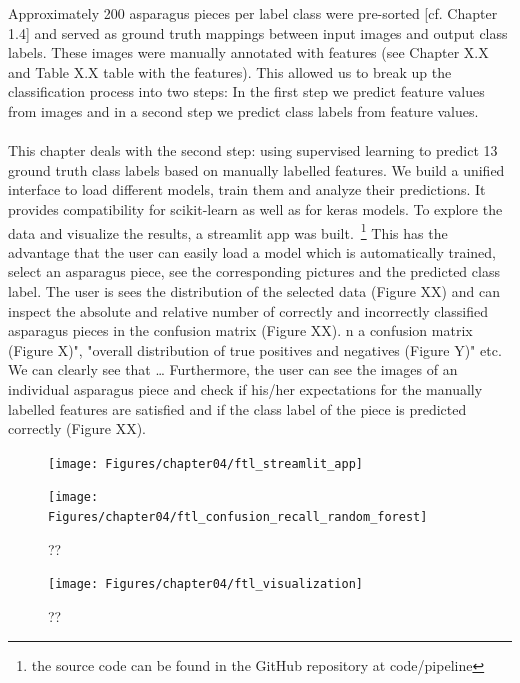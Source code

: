 Approximately 200 asparagus pieces per label class were pre-sorted [cf. Chapter 1.4] and served as ground truth mappings between input images and output class labels. These images were manually annotated with features (see Chapter X.X and Table X.X table with the features). This allowed us to break up the classification process into two steps: In the first step we predict feature values from images and in a second step we predict class labels from feature values. \\
\\
This chapter deals with the second step: using supervised learning to predict 13 ground truth class labels based on manually labelled features. We build a unified interface to load different models, train them and analyze their predictions. It provides compatibility for scikit-learn as well as for keras models. To explore the data and visualize the results, a streamlit app was built.~\footnote{the source code can be found in the GitHub repository at code/pipeline} This has the advantage that the user can easily load a model which is automatically trained, select an asparagus piece, see the corresponding pictures and the predicted class label. The user is sees the distribution of the selected data (Figure XX) and can inspect the absolute and relative number of correctly and incorrectly classified asparagus pieces in the confusion matrix (Figure XX). n a confusion matrix (Figure X)", "overall distribution of true positives and negatives (Figure Y)" etc. We can clearly see that … Furthermore, the user can see the images of an individual asparagus piece and check if  his/her expectations for the manually labelled features are satisfied and if the class label of the piece is predicted correctly (Figure XX). \\

\begin{figure}[H]
	\centering
	\texttt{[image: Figures/chapter04/ftl\_streamlit\_app]}
	\decoRule
	\caption[??]{??}
	\label{fig:FeaturetoLabelStreamlitApp}
	\centering
	\vspace{1cm}
	\texttt{[image: Figures/chapter04/ftl\_confusion\_recall\_random\_forest]}
	\decoRule
	\caption[??]{??}
	\label{fig:FeatureToLabelRandomForest}
\end{figure}

\begin{figure}[h]
	\centering
	\texttt{[image: Figures/chapter04/ftl\_visualization]}
	\decoRule
	\caption[??]{??}
	\label{fig:FeatureToLabelVisualization}
\end{figure}

